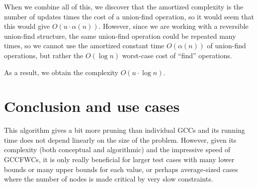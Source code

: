\documentclass[a4paper,10pt]{article}
\begin{document}
When we combine all of this, we discover that the amortized complexity is the number of updates times the cost of a union-find operation, so it would seem that this would give $O(u\cdot\alpha(n))$. However, since we are working with a reversible union-find structure, the same union-find operation could be repeated many times, so we cannot use the amortized constant time $O(\alpha(n))$ of union-find operations, but rather the $O(\log n)$ worst-case cost of ``find'' operations.

As a result, we obtain the complexity $O(u \cdot \log n)$.

\section{Conclusion and use cases}

This algorithm gives a bit more pruning than individual GCCs and its running time does not depend linearly on the size of the problem. However, given its complexity (both conceptual and algorithmic) and the impressive speed of GCCFWCs, it is only really beneficial for larger test cases with many lower bounds or many upper bounds for each value, or perhaps average-sized cases where the number of nodes is made critical by very slow constraints.
\end{document}
